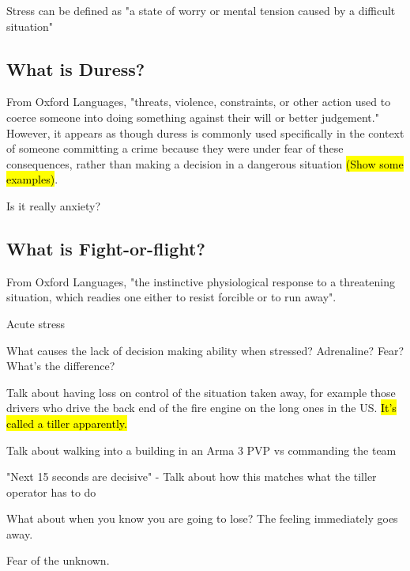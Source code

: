 \documentclass{article}
\begin{document}
  Stress can be defined as "a state of worry or mental tension caused by a difficult situation" 


  \subsection{What is Duress?}

  From Oxford Languages, "threats, violence, constraints, or other action used to coerce someone into doing something against their will or better judgement." However, it appears as though duress is commonly used specifically in the context of someone committing a crime because they were under fear of these consequences, rather than making a decision in a dangerous situation \hl{(Show some examples)}.

  Is it really anxiety?


  \subsection{What is Fight-or-flight?}

  From Oxford Languages, "the instinctive physiological response to a threatening situation, which readies one either to resist forcible or to run away".


  Acute stress

  What causes the lack of decision making ability when stressed? Adrenaline? Fear? What's the difference?



  Talk about having loss on control of the situation taken away, for example those drivers who drive the back end of the fire engine on the long ones in the US. \hl{It's called a tiller apparently.}




Talk about walking into a building in an Arma 3 PVP vs commanding the team

"Next 15 seconds are decisive" - Talk about how this matches what the tiller operator has to do

What about when you know you are going to lose? The feeling immediately goes away. 

Fear of the unknown.
\end{document}
